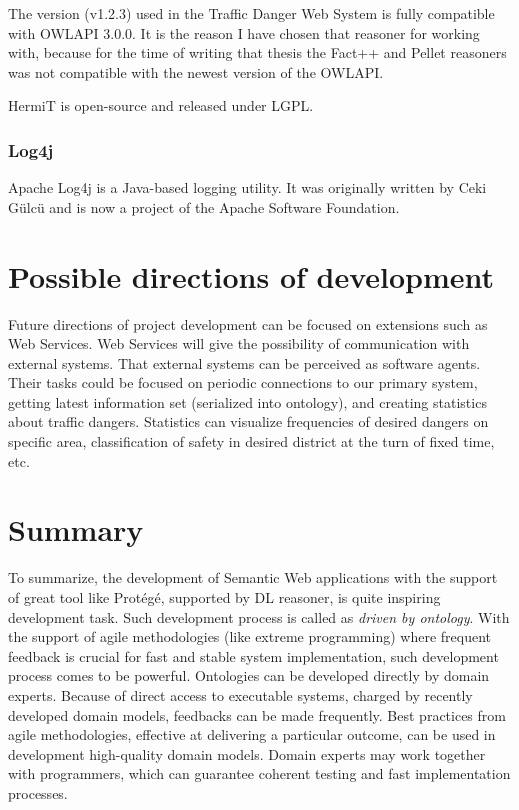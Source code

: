 The version (v1.2.3) used in the Traffic Danger Web System is fully compatible with OWLAPI 3.0.0. It is the reason I have chosen that reasoner for working with, because for the time of writing that thesis the Fact++ and Pellet reasoners was not compatible with the newest version of the OWLAPI.

HermiT is open-source and released under LGPL.

\subsubsection{Log4j}
\label{sss:log4j}

Apache Log4j is a Java-based logging utility. It was originally written by Ceki Gülcü and is now a project of the Apache Software Foundation.

\section{Possible directions of development}
\label{sub:possibleDirectionsOfDevelopment}

Future directions of project development can be focused on extensions such as Web Services. Web Services will give the possibility of communication with external systems. That external systems can be perceived as software agents. Their tasks could be focused on periodic connections to our primary system, getting latest information set (serialized into ontology), and creating statistics about traffic dangers. Statistics can visualize frequencies of desired dangers on specific area, classification of safety in desired district at the turn of fixed time, etc.

\section{Summary}
\label{sub:applicationDevelopementSummary}

To summarize, the development of Semantic Web applications with the support of great tool like Protégé, supported by DL reasoner, is quite inspiring development task. Such development process is called as \textit{driven by ontology}. With the support of agile methodologies (like extreme programming) where frequent feedback is crucial for fast and stable system implementation, such development process comes to be powerful. Ontologies can be developed directly by domain experts. Because of direct access to executable systems, charged by recently developed domain models, feedbacks can be made frequently. Best practices from agile methodologies, effective at delivering a particular outcome, can be used in development high-quality domain models. Domain experts may work together with programmers, which can guarantee coherent testing and fast implementation processes.
